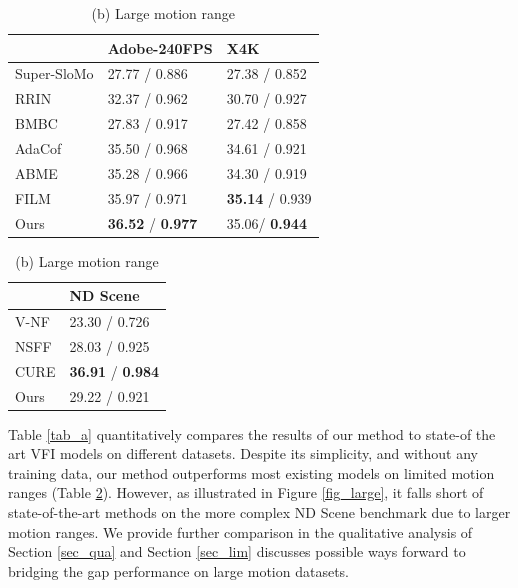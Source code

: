 \documentclass{article}
\begin{document}
\begin{table}[!t]
    \caption{Quantitative comparison to state-of-the-art VFI on Standard benchmarks. Results are formatted as PSNR / SSMI.}
    \begin{minipage}[t]{.5\linewidth}
      \centering
      \caption*{(a) Limited motion range}
      \begin{tabular}[t]{l | l | l }
       &  Adobe-240FPS &  X4K  \\
      \hline
      Super-SloMo \citep{jiang2018super} &  27.77 / 0.886 & 27.38 / 0.852  \\
      RRIN \cite{li2020video}  & 32.37 / 0.962 & 30.70 / 0.927  \\
      BMBC \citep{park2020bmbc}  & 27.83 / 0.917 & 27.42 / 0.858   \\
      AdaCof \cite{lee2020adacof} & 35.50 / 0.968 & 34.61 / 0.921 \\
      ABME   \cite{park2021asymmetric} & 35.28 / 0.966 & 34.30 / 0.919 \\
      FILM   \cite{reda2022film} &	35.97 / 0.971 & \textbf{35.14} / 0.939 \\
      Ours	& \textbf{36.52} / \textbf{0.977} & 35.06/ \textbf{0.944} \\
      \end{tabular}
    \label{tab_a}
    \end{minipage}%
    \begin{minipage}[t]{.5\linewidth}
      \centering
      \caption*{(b) Large motion range}
        \begin{tabular}[t]{l | l }
        	    &   ND Scene  \\
        \hline
        V-NF \cite{mildenhall2020nerf}   &  23.30 / 0.726 \\
        NSFF \cite{li2021neural}   & 28.03 / 0.925 \\
        CURE \cite{shangguan2022learning}   & \textbf{36.91} / \textbf{0.984} \\
        Ours	     & 29.22 / 0.921
        \end{tabular}
	\label{tab_b}
    \end{minipage}

\end{table}

Table \ref{tab_a} quantitatively compares the results of our method to state-of the art VFI models on different datasets.
Despite its simplicity, and without any training data, our method outperforms most existing models on limited motion ranges (Table \ref{tab_b}).
However, as illustrated in Figure \ref{fig_large}, it falls short of state-of-the-art methods on the more complex ND Scene benchmark due to larger motion ranges.
We provide further comparison in the qualitative analysis of Section \ref{sec_qua} and Section \ref{sec_lim}
discusses possible ways forward to bridging the gap performance on large motion datasets.
\end{document}
